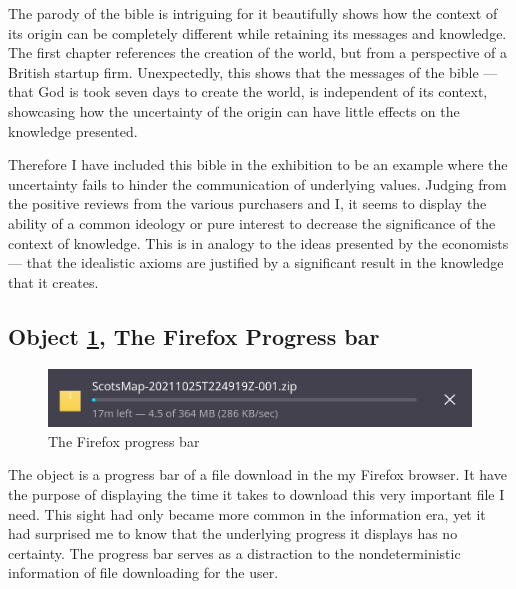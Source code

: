 \documentclass[a4paper,12pt]{article}
\begin{document}
The parody of the bible is intriguing for it beautifully shows how the context of its origin can be completely different while retaining its messages and knowledge. The first chapter references the creation of the world, but from a perspective of a British startup firm. Unexpectedly, this shows that the messages of the bible --- that God is took seven days to create the world, is independent of its context, showcasing how the uncertainty of the origin can have little effects on the knowledge presented.

Therefore I have included this bible in the exhibition to be an example where the uncertainty fails to hinder the communication of underlying values. Judging from the positive reviews from the various purchasers and I, it seems to display the ability of a common ideology or pure interest to decrease the significance of the context of knowledge. This is in analogy to the ideas presented by the economists --- that the idealistic axioms are justified by a significant result in the knowledge that it creates.




\subsection*{Object \ref{fig:download}, The Firefox Progress bar}

\begin{figure}[h!]
 \centering
 \includegraphics[scale=0.35]{progress.png}
 \caption{The Firefox progress bar}
 \label{fig:download}
\end{figure}


The object is a progress bar of a file download in the my Firefox browser. It have the purpose of displaying the time it takes to download this very important file I need. This sight had only became more common in the information era, yet it had surprised me to know that the underlying progress it displays has no certainty. The progress bar serves as a distraction to the nondeterministic information of file downloading for the user.
\end{document}
